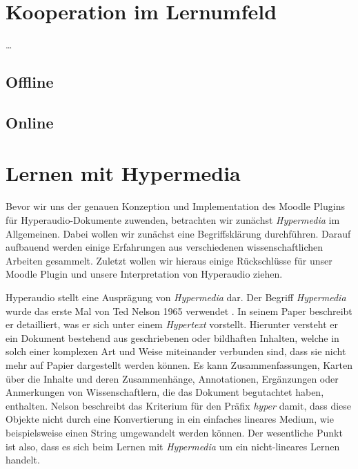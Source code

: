 \section{Kooperation im Lernumfeld}
\dots

\subsection{Offline}

\subsection{Online}


\section{Lernen mit Hypermedia}
Bevor wir uns der genauen Konzeption und Implementation des Moodle Plugins für Hyperaudio-Dokumente zuwenden, betrachten wir zunächst \textit{Hypermedia} im Allgemeinen. Dabei wollen wir zunächst eine Begriffsklärung durchführen. Darauf aufbauend werden einige Erfahrungen aus verschiedenen wissenschaftlichen Arbeiten gesammelt. Zuletzt wollen wir hieraus einige Rückschlüsse für unser Moodle Plugin und unsere Interpretation von Hyperaudio ziehen.

Hyperaudio stellt eine Ausprägung von \textit{Hypermedia} dar. Der Begriff \textit{Hypermedia} wurde das erste Mal von Ted Nelson 1965 verwendet \citep{nelson1965complex}. In seinem Paper beschreibt er detailliert, was er sich unter einem \textit{Hypertext} vorstellt. Hierunter versteht er ein Dokument bestehend aus geschriebenen oder bildhaften Inhalten, welche in solch einer komplexen Art und Weise miteinander verbunden sind, dass sie nicht mehr auf Papier dargestellt werden können. Es kann Zusammenfassungen, Karten über die Inhalte und deren Zusammenhänge, Annotationen, Ergänzungen oder Anmerkungen von Wissenschaftlern, die das Dokument begutachtet haben, enthalten. Nelson beschreibt das Kriterium für den Präfix \textit{hyper} damit, dass diese Objekte nicht durch eine Konvertierung in ein einfaches lineares Medium, wie beispielsweise einen String umgewandelt werden können. Der wesentliche Punkt ist also, dass es sich beim Lernen mit \textit{Hypermedia} um ein nicht-lineares Lernen handelt.

